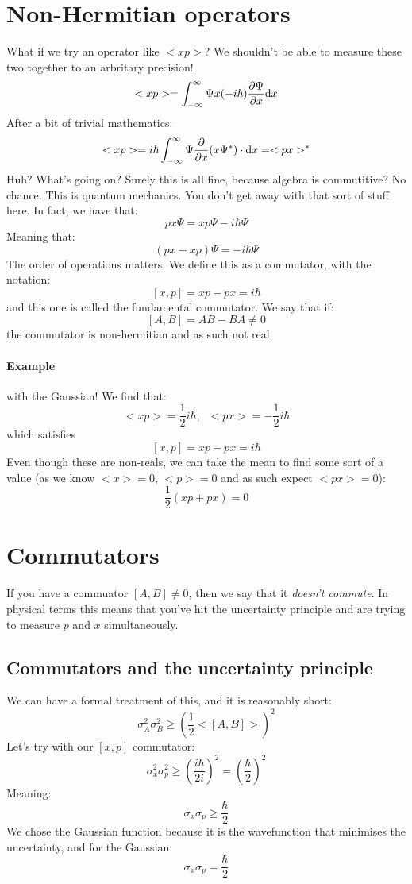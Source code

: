 \section{Non-Hermitian operators}
What if we try an operator like $<xp>$? We shouldn't be able to measure these
two together to an arbritary precision!
$$
	<xp> = \int^\infty_{-\infty} \Psi x (-i \hbar) \frac{\partial \Psi}{\partial x}
	\mathrm{d}x
$$
After a bit of trivial mathematics:
$$
	<xp> = i\hbar \int^\infty_{-\infty} \Psi \frac{\partial}{\partial x} (x \Psi^*) 
	\cdot \mathrm{d}x = <px>^*
$$
Huh? What's going on? Surely this is all fine, because algebra is commutitive?
No chance. This is quantum mechanics. You don't get away with that sort of stuff
here. In fact, we have that:
$$
	px\Psi = xp\Psi - i\hbar \Psi
$$
Meaning that:
$$
	(px - xp)\Psi = -i\hbar\Psi
$$
The order of operations matters. We define this as a commutator, with the
notation:
$$
	[x,p] = xp-px = i\hbar
$$
and this one is called the fundamental commutator. We say that if:
$$
	[A,B] = AB - BA \neq 0
$$
the commutator is non-hermitian and as such not real.
\paragraph{Example} with the Gaussian!
We find that:
$$
	<xp> = \frac{1}{2}i\hbar, \; \; <px> = -\frac{1}{2}i\hbar
$$
which satisfies
$$
	[x,p] = xp-px = i\hbar
$$
Even though these are non-reals, we can take the mean to find some sort of a
value (as we know $<x> = 0$, $<p> = 0$ and as such expect $<px> = 0$):
$$
	\frac{1}{2}(xp+px) = 0
$$

\section{Commutators}
If you have a commuator $[A,B] \neq 0$, then we say that it \emph{doesn't
commute}. In physical terms this means that you've hit the uncertainty principle
and are trying to measure $p$ and $x$ simultaneously.

\subsection{Commutators and the uncertainty principle}
We can have a formal treatment of this, and it is reasonably short:
$$
	\sigma_A^2 \sigma_B^2 \geq (\frac{1}{2}<[A,B]>)^2
$$
Let's try with our $[x,p]$ commutator:
$$
	\sigma_x^2 \sigma_p^2 \geq \left(\frac{i\hbar}{2i}\right)^2 = 
	\left(\frac{\hbar}{2}\right)^2
$$
Meaning:
$$
	\sigma_x \sigma_p \geq \frac{\hbar}{2}
$$
We chose the Gaussian function because it is the wavefunction that minimises
the uncertainty, and for the Gaussian:
$$
	\sigma_x \sigma_p = \frac{\hbar}{2}
$$

